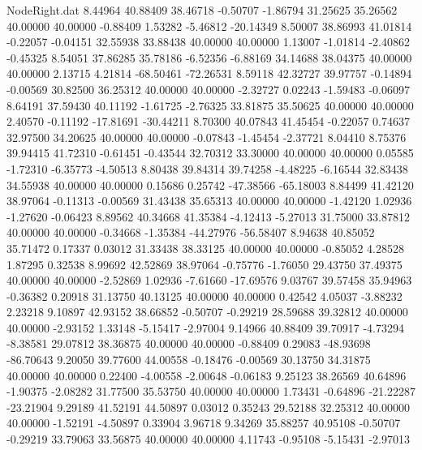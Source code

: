 \begin{filecontents}{NodeRight.dat}
   8.44964   40.88409   38.46718    -0.50707   -1.86794   31.25625   35.26562   40.00000   40.00000   -0.88409    1.53282   -5.46812  -20.14349
   8.50007   38.86993   41.01814    -0.22057   -0.04151   32.55938   33.88438   40.00000   40.00000    1.13007   -1.01814   -2.40862   -0.45325
   8.54051   37.86285   35.78186    -6.52356   -6.88169   34.14688   38.04375   40.00000   40.00000    2.13715    4.21814  -68.50461  -72.26531
   8.59118   42.32727   39.97757    -0.14894   -0.00569   30.82500   36.25312   40.00000   40.00000   -2.32727    0.02243   -1.59483   -0.06097
   8.64191   37.59430   40.11192    -1.61725   -2.76325   33.81875   35.50625   40.00000   40.00000    2.40570   -0.11192  -17.81691  -30.44211
   8.70300   40.07843   41.45454    -0.22057    0.74637   32.97500   34.20625   40.00000   40.00000   -0.07843   -1.45454   -2.37721    8.04410
   8.75376   39.94415   41.72310    -0.61451   -0.43544   32.70312   33.30000   40.00000   40.00000    0.05585   -1.72310   -6.35773   -4.50513
   8.80438   39.84314   39.74258    -4.48225   -6.16544   32.83438   34.55938   40.00000   40.00000    0.15686    0.25742  -47.38566  -65.18003
   8.84499   41.42120   38.97064    -0.11313   -0.00569   31.43438   35.65313   40.00000   40.00000   -1.42120    1.02936   -1.27620   -0.06423
   8.89562   40.34668   41.35384    -4.12413   -5.27013   31.75000   33.87812   40.00000   40.00000   -0.34668   -1.35384  -44.27976  -56.58407
   8.94638   40.85052   35.71472     0.17337    0.03012   31.33438   38.33125   40.00000   40.00000   -0.85052    4.28528    1.87295    0.32538
   8.99692   42.52869   38.97064    -0.75776   -1.76050   29.43750   37.49375   40.00000   40.00000   -2.52869    1.02936   -7.61660  -17.69576
   9.03767   39.57458   35.94963    -0.36382    0.20918   31.13750   40.13125   40.00000   40.00000    0.42542    4.05037   -3.88232    2.23218
   9.10897   42.93152   38.66852    -0.50707   -0.29219   28.59688   39.32812   40.00000   40.00000   -2.93152    1.33148   -5.15417   -2.97004
   9.14966   40.88409   39.70917    -4.73294   -8.38581   29.07812   38.36875   40.00000   40.00000   -0.88409    0.29083  -48.93698  -86.70643
   9.20050   39.77600   44.00558    -0.18476   -0.00569   30.13750   34.31875   40.00000   40.00000    0.22400   -4.00558   -2.00648   -0.06183
   9.25123   38.26569   40.64896    -1.90375   -2.08282   31.77500   35.53750   40.00000   40.00000    1.73431   -0.64896  -21.22287  -23.21904
   9.29189   41.52191   44.50897     0.03012    0.35243   29.52188   32.25312   40.00000   40.00000   -1.52191   -4.50897    0.33904    3.96718
   9.34269   35.88257   40.95108    -0.50707   -0.29219   33.79063   33.56875   40.00000   40.00000    4.11743   -0.95108   -5.15431   -2.97013

\end{filecontents}
